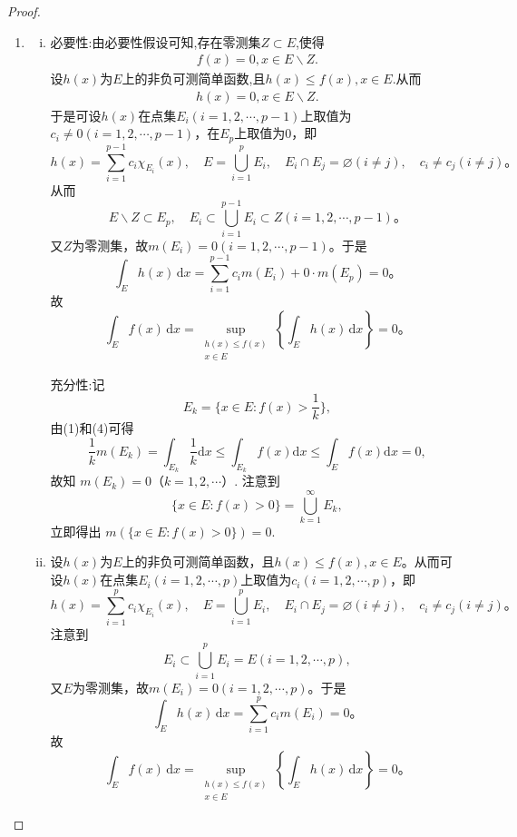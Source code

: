\documentclass[../../main.tex]{subfiles}%
\begin{document}
\begin{proof}
\begin{enumerate}[(1)]
\item \begin{enumerate}[(i)]
\item {\heiti 必要性:}由必要性假设可知,存在零测集$Z\subset E$,使得
\begin{align*}
f(x)=0,x\in E\backslash Z.
\end{align*}
设$h(x)$为$E$上的非负可测简单函数,且$h(x)\leqslant f(x),x\in E$.从而
\begin{align*}
h(x)=0,x\in E\backslash Z.
\end{align*}
于是可设$h(x)$在点集$E_i (i = 1,2,\cdots,p-1)$上取值为$c_i\ne 0 (i = 1,2,\cdots,p-1)$，在$E_p$上取值为$0$，即
\[
h(x) = \sum_{i=1}^{p-1} c_i \chi_{E_i}(x),\quad E = \bigcup_{i=1}^p E_i,\quad E_i \cap E_j = \varnothing (i \ne j),\quad c_i \ne c_j (i \ne j)。
\]
从而
\[
E\backslash Z \subset E_p,\quad E_i \subset \bigcup_{i=1}^{p-1} E_i \subset Z (i = 1,2,\cdots,p-1)。
\]
又$Z$为零测集，故$m(E_i) = 0 (i = 1,2,\cdots,p-1)$。于是
\[
\int_E h(x)\,\mathrm{d}x = \sum_{i=1}^{p-1} c_i m(E_i) + 0 \cdot m(E_p) = 0。
\]
故
\[
\int_E f(x)\,\mathrm{d}x = \sup_{\substack{h(x) \leqslant f(x) \\ x \in E}} \left\{ \int_E h(x)\,\mathrm{d}x \right\} = 0。
\]

{\heiti 充分性:}记
\[E_k=\{x\in E:f(x)>\frac{1}{k}\},\]
由(1)和(4)可得
\[\frac{1}{k}m(E_k)=\int_{E_k}\frac{1}{k}\mathrm{d}x\leqslant \int_{E_k}f(x)\mathrm{d}x\leqslant \int_{E}f(x)\mathrm{d}x = 0,\]
故知 \(m(E_k)=0\)（\(k = 1,2,\cdots\)）. 注意到
\[\{x\in E:f(x)>0\}=\bigcup_{k = 1}^{\infty}E_k,\]
立即得出 \(m(\{x\in E:f(x)>0\}) = 0\).

\item 设$h(x)$为$E$上的非负可测简单函数，且$h(x) \leqslant f(x), x\in E$。从而可设$h(x)$在点集$E_i (i = 1,2,\cdots,p)$上取值为$c_i (i = 1,2,\cdots,p)$，即
\[
h(x) = \sum_{i=1}^p c_i \chi_{E_i}(x),\quad E = \bigcup_{i=1}^p E_i,\quad E_i \cap E_j = \varnothing (i \ne j),\quad c_i \ne c_j (i \ne j)。
\]
注意到
\[
E_i \subset \bigcup_{i=1}^p E_i = E (i = 1,2,\cdots,p),
\]
又$E$为零测集，故$m(E_i) = 0 (i = 1,2,\cdots,p)$。于是
\[
\int_E h(x)\,\mathrm{d}x = \sum_{i=1}^p c_i m(E_i) = 0。
\]
故
\[
\int_E f(x)\,\mathrm{d}x = \sup_{\substack{h(x) \leqslant f(x) \\ x \in E}} \left\{ \int_E h(x)\,\mathrm{d}x \right\} = 0。
\]
\end{enumerate}
\end{enumerate} 
\end{proof}
\end{document}
